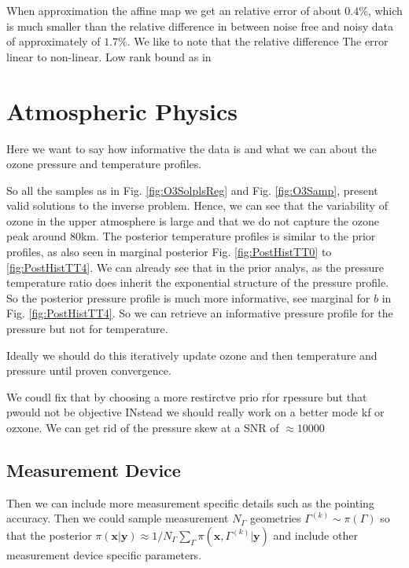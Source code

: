 When approximation the affine map we get an relative error of about $0.4\%$, which is much smaller than the relative difference in between noise free and noisy data of approximately of $1.7 \%$.
We like to note that the relative difference 
The error linear to non-linear.
Low rank bound as in \cite{Rohrbach2022tterror}

\section{Atmospheric Physics}
Here we want to say how informative the data is and what we can about the ozone pressure and temperature profiles.

So all the samples as in Fig. \ref{fig:O3SolplsReg} and Fig. \ref{fig:O3Samp}, present valid solutions to the inverse problem.
Hence, we can see that the variability of ozone in the upper atmosphere is large and that we do not capture the ozone peak around $80$km.
The posterior temperature profiles is similar to the prior profiles, as also seen in marginal posterior Fig. \ref{fig:PostHistTT0} to \ref{fig:PostHistTT4}.
We can already see that in the prior analys, as the pressure temperature ratio does inherit the exponential structure of the pressure profile.
So the posterior pressure profile is much more informative, see marginal for $b$ in Fig. \ref{fig:PostHistTT4}. 
So we can retrieve an informative pressure profile for the pressure but not for temperature.

Ideally we should do this iteratively update ozone and then temperature and pressure until proven convergence.

We coudl fix that by choosing a more restirctve prio rfor rpessure but that pwould not be objective 
INstead we should really work on a better mode kf or ozxone.
We can get rid of the pressure skew at a SNR of $\approx 10000$
\subsection{Measurement Device}
Then we can include more measurement specific details such as the pointing accuracy.
Then we could sample measurement $N_{\Gamma}$ geometries $\Gamma^{(k)}\sim \pi(\Gamma)$ so that the posterior $\pi(\bm{x}|\bm{y}) \approx 1/N_{\Gamma} \sum_{\Gamma} \pi(\bm{x}, \Gamma^{(k)}|\bm{y})$ and include other measurement device specific parameters.



